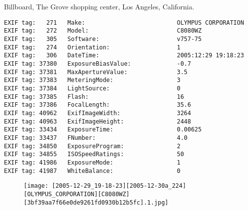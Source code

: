 \section{\protect{}}
\noindent Billboard, The Grove shopping center, Los Angeles, California.
\noindent
\begin{lstlisting}
EXIF tag:   271   Make:                          OLYMPUS CORPORATION
EXIF tag:   272   Model:                         C8080WZ
EXIF tag:   305   Software:                      v757-75
EXIF tag:   274   Orientation:                   1
EXIF tag:   306   DateTime:                      2005:12:29 19:18:23
EXIF tag: 37380   ExposureBiasValue:             -0.7
EXIF tag: 37381   MaxApertureValue:              3.5
EXIF tag: 37383   MeteringMode:                  3
EXIF tag: 37384   LightSource:                   0
EXIF tag: 37385   Flash:                         16
EXIF tag: 37386   FocalLength:                   35.6
EXIF tag: 40962   ExifImageWidth:                3264
EXIF tag: 40963   ExifImageHeight:               2448
EXIF tag: 33434   ExposureTime:                  0.00625
EXIF tag: 33437   FNumber:                       4.0
EXIF tag: 34850   ExposureProgram:               2
EXIF tag: 34855   ISOSpeedRatings:               50
EXIF tag: 41986   ExposureMode:                  1
EXIF tag: 41987   WhiteBalance:                  0

\end{lstlisting}
\clearpage
\begin{figure}
\raggedleft
\texttt{[image: [2005-12-29\_19-18-23][2005-12-30a\_224][OLYMPUS\_CORPORATION][C8080WZ][3bf39aa7f66e0de9261fd0930b12b5fc].1.jpg]}
\end{figure}


\clearpage
